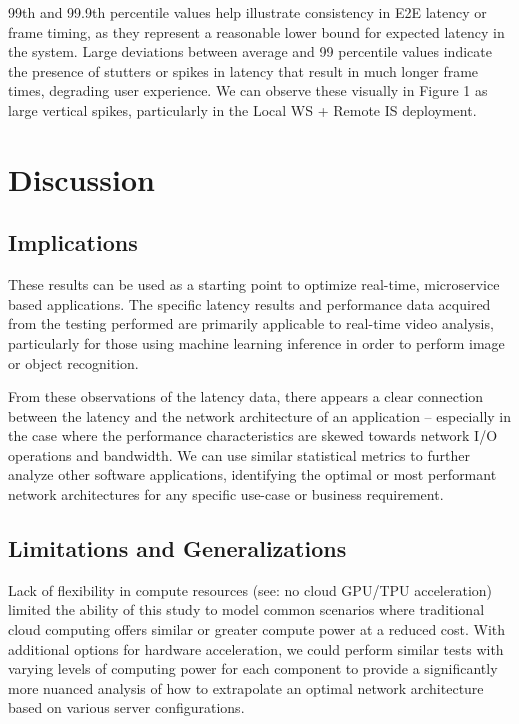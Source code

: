 \documentclass[11pt]{article}
\begin{document}
99th and 99.9th percentile values help illustrate consistency in E2E latency or frame timing,
as they represent a reasonable lower bound for expected latency in the system. Large 
deviations between average and 99 percentile values indicate the presence of stutters or spikes
in latency that result in much longer frame times, degrading user experience. We can observe these
visually in Figure 1 as large vertical spikes, particularly in the Local WS + Remote IS deployment.

\newpage
\section{Discussion}
\subsection{Implications}
These results can be used as a starting point to optimize real-time, microservice based applications.
The specific latency results and performance data acquired from the testing performed are primarily
applicable to real-time video analysis, particularly for those using machine learning inference 
in order to perform image or object recognition. \newline

From these observations of the latency data, there appears a clear connection between the latency 
and the network architecture of an application -- especially in the case where the performance
characteristics are skewed towards network I/O operations and bandwidth. We can use similar
statistical metrics to further analyze other software applications, identifying the optimal or
most performant network architectures for any specific use-case or business requirement.

\subsection{Limitations and Generalizations}
Lack of flexibility in compute resources (see: no cloud GPU/TPU acceleration) limited the ability of
this study to model common scenarios where traditional cloud computing offers similar or greater
compute power at a reduced cost. With additional options for hardware acceleration, we could 
perform similar tests with varying levels of computing power for each component to provide a 
significantly more nuanced analysis of how to extrapolate an optimal network architecture based on 
various server configurations.\newline
\end{document}
